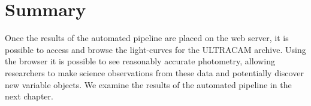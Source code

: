 \section{Summary}
Once the results of the automated pipeline are placed on the web server, it is  possible to access and browse the light-curves for the ULTRACAM archive. Using the browser it is possible to see reasonably accurate photometry, allowing researchers to make science observations from these data and potentially discover new variable objects. We examine the results of the automated pipeline in the next chapter. 

